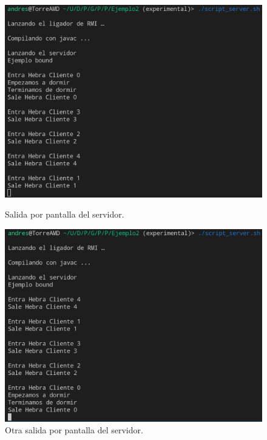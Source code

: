 \documentclass{article}
\begin{document}
\begin{figure}[H]
    \centering
    \begin{minipage}[H]{0.49\textwidth}
        \centering
        \includegraphics[width=\textwidth]{imagenes/E2ServerSync1.png}
        \caption{Salida por pantalla del servidor.}
    \end{minipage}
    \hfill
    \begin{minipage}[H]{0.49\textwidth}
        \centering
        \includegraphics[width=\textwidth]{imagenes/E2ServerSync2.png}
        \caption{Otra salida por pantalla del servidor.}
    \end{minipage}
\end{figure}
\end{document}
